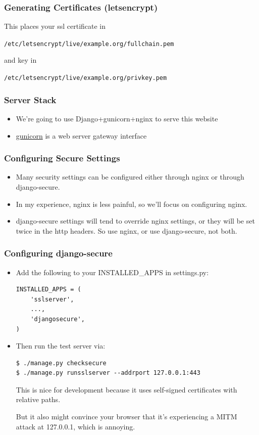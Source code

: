 \documentclass[9pt]{beamer}
\begin{document}
\begin{frame}[fragile]
  \frametitle{Generating Certificates (letsencrypt)}
  This places your ssl certificate in

  \texttt{/etc/letsencrypt/live/example.org/fullchain.pem}

  and key in

  \texttt{/etc/letsencrypt/live/example.org/privkey.pem}
\end{frame}


\begin{frame}[fragile]
\frametitle{Server Stack}
\begin{itemize}
\item We're going to use Django+gunicorn+nginx to serve this website
\pause
\item \href{http://gunicorn.org/\#deployment}{gunicorn} is a web server gateway interface
\end{itemize}
\end{frame}

\begin{frame}[fragile]
\frametitle{Configuring Secure Settings}
\begin{itemize}
\item Many security settings can be configured either through nginx or through django-secure.
\pause
\item In my experience, nginx is less painful, so we'll focus on configuring nginx.
\pause 
\item django-secure settings will tend to override nginx settings, or they will be set twice in the http headers. So use nginx, or use django-secure, not both.
\end{itemize}
\end{frame}

\begin{frame}[fragile]
\frametitle{Configuring django-secure}
\begin{itemize}
\item Add the following to your INSTALLED\_APPS in settings.py:
\begin{verbatim}
INSTALLED_APPS = (
    'sslserver',
    ...,
    'djangosecure',
)
\end{verbatim}
\pause
\item Then run the test server via:
\begin{verbatim}
$ ./manage.py checksecure 
$ ./manage.py runsslserver --addrport 127.0.0.1:443
\end{verbatim}
This is nice for development because it uses self-signed certificates with relative paths.

But it also might convince your browser that it's experiencing a MITM attack at 127.0.0.1, which is annoying.
\end{itemize}
\end{frame}
\end{document}
